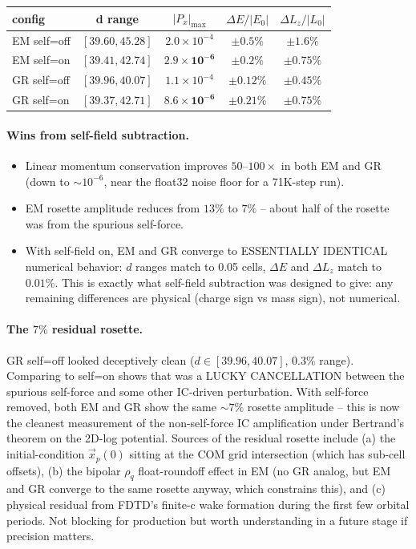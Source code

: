 \documentclass[11pt,a4paper]{article}
\begin{document}
\begin{center}
\begin{tabular}{lcccc}
\toprule
config & d range & $|P_x|_{\max}$ & $\Delta E/|E_0|$ & $\Delta L_z/|L_0|$ \\
\midrule
EM self=off & $[39.60, 45.28]$ & $2.0 \times 10^{-4}$ & $\pm 0.5\%$  & $\pm 1.6\%$ \\
EM self=on  & $[39.41, 42.74]$ & $\mathbf{2.9 \times 10^{-6}}$ & $\pm 0.2\%$  & $\pm 0.75\%$ \\
GR self=off & $[39.96, 40.07]$ & $1.1 \times 10^{-4}$ & $\pm 0.12\%$ & $\pm 0.45\%$ \\
GR self=on  & $[39.37, 42.71]$ & $\mathbf{8.6 \times 10^{-6}}$ & $\pm 0.21\%$ & $\pm 0.75\%$ \\
\bottomrule
\end{tabular}
\end{center}

\paragraph{Wins from self-field subtraction.}
\begin{itemize}
  \item Linear momentum conservation improves $50$--$100\times$ in
    both EM and GR (down to $\sim 10^{-6}$, near the float32 noise
    floor for a 71K-step run).
  \item EM rosette amplitude reduces from $13\%$ to $7\%$ -- about
    half of the rosette was from the spurious self-force.
  \item With self-field on, EM and GR converge to ESSENTIALLY
    IDENTICAL numerical behavior: $d$ ranges match to 0.05 cells,
    $\Delta E$ and $\Delta L_z$ match to $0.01\%$.  This is exactly
    what self-field subtraction was designed to give: any remaining
    differences are physical (charge sign vs mass sign), not
    numerical.
\end{itemize}

\paragraph{The $7\%$ residual rosette.}  GR self=off looked
deceptively clean ($d \in [39.96, 40.07]$, $0.3\%$ range).  Comparing
to self=on shows that was a LUCKY CANCELLATION between the spurious
self-force and some other IC-driven perturbation.  With self-force
removed, both EM and GR show the same $\sim 7\%$ rosette amplitude --
this is now the cleanest measurement of the non-self-force IC
amplification under Bertrand's theorem on the 2D-log potential.
Sources of the residual rosette include (a) the initial-condition
$\vec x_p(0)$ sitting at the COM grid intersection (which has
sub-cell offsets), (b) the bipolar $\rho_q$ float-roundoff effect in
EM (no GR analog, but EM and GR converge to the same rosette anyway,
which constrains this), and (c) physical residual from FDTD's finite-c
wake formation during the first few orbital periods.  Not blocking
for production but worth understanding in a future stage if precision
matters.
\end{document}
